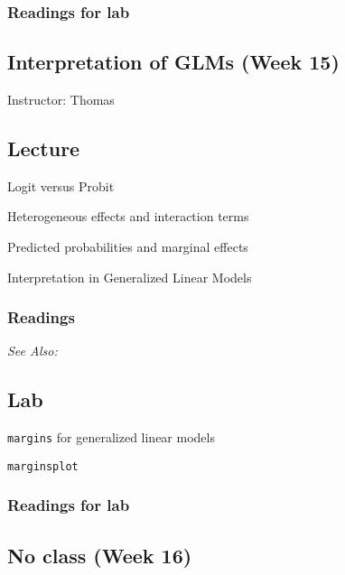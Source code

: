 \documentclass[11pt,a4paper]{article}
\newcommand{\thomas}{\vspace{1em}\noindent Instructor: Thomas\vspace{1em}\\}
\newcommand{\seealso}{\noindent \emph{See Also:}\\}
\begin{document}
\subsubsection*{Readings for lab}


\clearpage
\subsection{Interpretation of GLMs (Week 15)}
\emph{}

\thomas

\subsection*{Lecture}
\begin{itemize*}
\item Logit versus Probit %
\item Heterogeneous effects and interaction terms
\item Predicted probabilities and marginal effects
\item Interpretation in Generalized Linear Models
\end{itemize*}

\subsubsection*{Readings}

\seealso


\subsection*{Lab}

\begin{itemize*}
\item \texttt{margins} for generalized linear models
\item \texttt{marginsplot}
\end{itemize*}

\subsubsection*{Readings for lab}



\clearpage
\subsection*{No class (Week 16)} %
\end{document}
